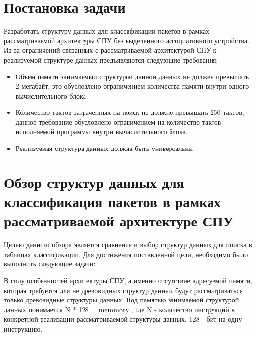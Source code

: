 \documentclass[a4peper, 12pt, titlepage, finall]{report}
\begin{document}
    \chapter{Постановка задачи} 
        Разработать структуру данных для классификации пакетов в рамках рассматриваемой архитектуры СПУ без выделенного ассоциативного устройства. 
        Из-за ограничений связанных с рассматриваемой архитектурой СПУ к реализуемой структуре данных предъявляются следующие требования:
        \begin{itemize}
            \item Объём памяти занимаемый структурой данной данных не должен превышать 2 мегабайт, это обусловлено ограничением количества памяти внутри одного вычислительного блока
            \item Количество тактов затраченных на поиск не должно превышать 250 тактов, данное требование обусловлено ограничением на количество тактов исполняемой программы внутри
                вычислительного блока.
            \item Реализуемая структура данных должна быть универсальна.
        \end{itemize}
    \chapter{Обзор структур данных для классификация пакетов в рамках рассматриваемой архитектуре СПУ}
            Целью данного обзора является сравнение и выбор структур данных для поиска в таблицах классификации. 
            Для достижения поставленной цели, необходимо было выполнить следующие задачи:

            В силу особенностей архитектуры СПУ, а именно отсутствие адресуемой памяти, 
            которая требуется для не древовидных структур данных будут рассматриваться только древовидные структуры данных. 
            Под памятью занимаемой структурой данных понимается  {\ttfamily   N * 128 = memmory} , где {\ttfamily N} - количество 
            инструкций в конкретной реализации рассматриваемой структуры данных, 128 - бит на одну инструкцию.
    
\end{document}
